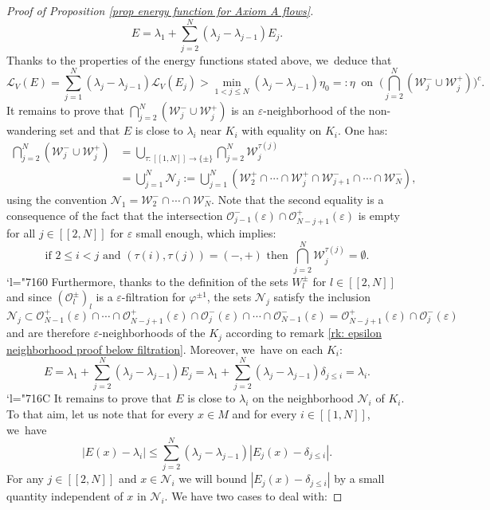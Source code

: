 \documentclass[JEP,XML,SOM,Unicode,NoEqCountersInSection,NoFloatCountersInSection,published]{cedram}
\newcommand{\Changel}{\mathcode`l="7160}
\newcommand{\Changelback}{\mathcode`l="716C}
\newcommand{\lcr}{[\![}
\newcommand{\rcr}{]\!]}
\theoremstyle{definition}
\theoremstyle{plain}
\newcommand{\Lie}{\mathcal{L}}
\newcommand{\Ncal}{\mathcal{N}}
\newcommand{\Ocal}{\mathcal{O}}
\newcommand{\Wcal}{\mathcal{W}}
\begin{document}
\begin{proof}[Proof of Proposition \ref{prop energy function for Axiom A flows}]
\[
E = \lambda_1 + \sum_{j = 2}^N (\lambda_{j} - \lambda_{j-1}) E_{j}.
\]
Thanks to the properties of the energy functions stated above, we~deduce that
\[
\Lie_V (E) = \sum_{j = 1}^N (\lambda_j - \lambda_{j-1}) \Lie_V (E_j) > \min_{1 < j \leq N}(\lambda_j - \lambda_{j-1}) \eta_0 =: \eta \: \text{ on } \: \biggl(\bigcap_{j =2}^N (\Wcal_j^- \cup \Wcal_j^+) \biggr)^c.
\]
It remains to prove that $\bigcap_{j = 2}^N (\Wcal_j^- \cup \Wcal_j^+)$ is an $\varepsilon$-neighborhood of the non-wandering set and that $E$ is close to $\lambda_i$ near $K_i$ with equality on $K_i$. One has:
\begin{align*}
\bigcap_{j = 2}^N (\Wcal_j^- \cup \Wcal_j^+) &= \bigcup_{\tau: \lcr1,N\rcr \to \{\pm\}} \bigcap_{j = 2}^N \Wcal_j^{\tau (j)} \\
&= \bigcup_{j = 1}^N \Ncal_j:= \bigcup_{j = 1}^N \left(\Wcal_{2}^+ \cap \cdots \cap \Wcal_{j}^+ \cap \Wcal_{j+1}^- \cap \cdots \cap \Wcal_{N}^- \right),
\end{align*}
using the convention $\Ncal_1 = \Wcal_{2}^- \cap \cdots \cap \Wcal_{N}^-$.
Note that the second equality is a consequence of the fact that the intersection $\Ocal_{j-1}^- (\varepsilon) \cap \Ocal_{N-j+1}^+ (\varepsilon)$ is empty for all $j\in\lcr2,N\rcr$ for $\varepsilon $ small enough, which implies:
\[
\text{if } 2 \leq i < j \text{ and } (\tau (i), \tau (j)) = (-,+) \text{ then } \bigcap_{j = 2}^N \Wcal_j^{\tau (j)} = \emptyset.
\]
\Changel
\noindent
Furthermore, thanks to the definition of the sets $W_l^{\pm}$ for $l\in\lcr2,N\rcr$ and since $(\Ocal_l^{\pm})_l$ is a $\varepsilon$-filtration for $\varphi^{\pm 1}$, the sets $\Ncal_j$ satisfy the inclusion
\[
\Ncal_j \subset \Ocal_{N-1}^+ (\varepsilon) \cap \cdots \cap \Ocal_{N-j+1}^+ (\varepsilon) \cap \Ocal_{j}^- (\varepsilon) \cap \cdots \cap \Ocal_{N-1}^- (\varepsilon) = \Ocal_{N-j+1}^+ (\varepsilon) \cap \Ocal_{j}^- (\varepsilon)
\]
and are therefore $\varepsilon$-neighborhoods of the $K_j$ according to remark \ref{rk: epsilon neighborhood proof below filtration}.
Moreover, we~have on each $K_i$:
\[
E = \lambda_1 + \sum_{j = 2}^N (\lambda_j - \lambda_{j-1}) E_j = \lambda_1 + \sum_{j = 2}^N (\lambda_j - \lambda_{j-1}) \delta_{j \leq i} = \lambda_i.
\]
\Changelback
\noindent
It remains to prove that $E$ is close to $\lambda_i$ on the neighborhood $\Ncal_i$ of $K_i$. To that aim, let us note that for every $x \in M$ and for every $i\in\lcr1,N\rcr$, we~have
\[
|E(x) - \lambda_i | \leq \sum_{j = 2}^N (\lambda_j - \lambda_{j-1}) |E_j (x) - \delta_{j \leq i} |.
\]
For any $j\in\lcr2,N\rcr$ and $x \in \Ncal_i$ we will bound $|E_j (x) - \delta_{j \leq i}|$ by a small quantity independent of $x$ in $\Ncal_i$. We have two cases to deal with:

\end{proof}
\end{document}
